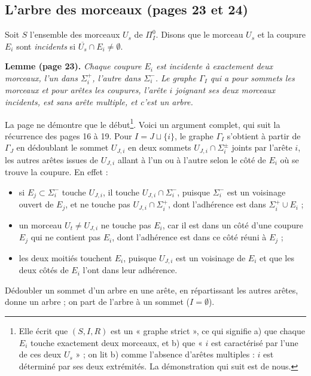 \documentclass[11pt,a4paper]{article}
\begin{document}
\subsection*{L'arbre des morceaux (pages 23 et 24)}

Soit $S$ l'ensemble des morceaux $U_s$ de $\Pi_I^0$. Disons que le morceau
$U_s$ et la coupure $E_i$ sont \emph{incidents} si $\overline{U_s} \cap E_i
\neq \emptyset$.

\textbf{Lemme (page 23).} \emph{Chaque coupure $E_i$ est incidente à
exactement deux morceaux, l'un dans $\Sigma_i^{+}$, l'autre dans
$\Sigma_i^{-}$. Le graphe $\Gamma_I$ qui a pour sommets les morceaux et pour
arêtes les coupures, l'arête $i$ joignant ses deux morceaux incidents, est
sans arête multiple, et c'est un arbre.}

La page ne démontre que le début\footnote{Elle écrit que $(S, I, R)$ est un
« graphe strict », ce qui signifie a) que chaque $E_i$ touche exactement
deux morceaux, et b) que « $i$ est caractérisé par l'une de ces deux
$U_s$ » ; on lit b) comme l'absence d'arêtes multiples : $i$ est déterminé
par ses deux extrémités. La démonstration qui suit est de nous.}. Voici un
argument complet, qui suit la récurrence des pages 16 à 19. Pour $I = J
\sqcup \{i\}$, le graphe $\Gamma_I$ s'obtient à partir de $\Gamma_J$ en
dédoublant le sommet $U_{J,i}$ en deux sommets $U_{J,i} \cap \Sigma_i^{\pm}$
joints par l'arête $i$, les autres arêtes issues de $U_{J,i}$ allant à l'un
ou à l'autre selon le côté de $E_i$ où se trouve la coupure. En effet :
\begin{itemize}
  \item si $E_j \subset \Sigma_i^{-}$ touche $U_{J,i}$, il touche $U_{J,i}
  \cap \Sigma_i^{-}$, puisque $\Sigma_i^{-}$ est un voisinage ouvert de $E_j$,
  et ne touche pas $U_{J,i} \cap \Sigma_i^{+}$, dont l'adhérence est dans
  $\Sigma_i^{+} \cup E_i$ ;
  \item un morceau $U_t \neq U_{J,i}$ ne touche pas $E_i$, car il est dans
  un côté d'une coupure $E_j$ qui ne contient pas $E_i$, dont l'adhérence est
  dans ce côté réuni à $E_j$ ;
  \item les deux moitiés touchent $E_i$, puisque $U_{J,i}$ est un voisinage
  de $E_i$ et que les deux côtés de $E_i$ l'ont dans leur adhérence.
\end{itemize}
Dédoubler un sommet d'un arbre en une arête, en répartissant les autres
arêtes, donne un arbre ; on part de l'arbre à un sommet ($I = \emptyset$).
\end{document}
